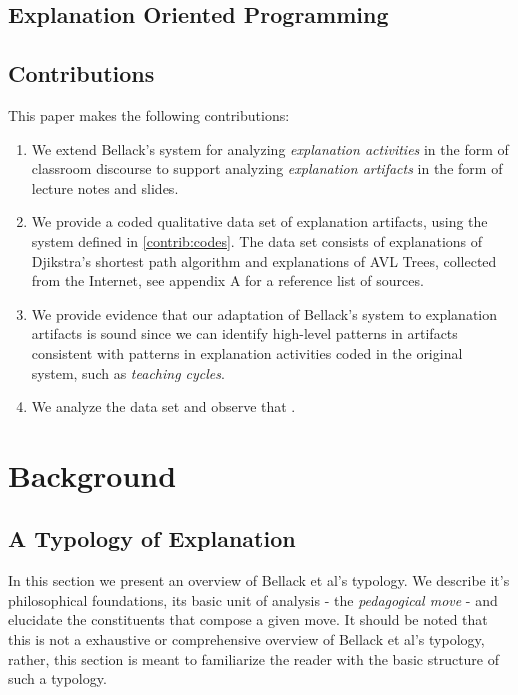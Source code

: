 \documentclass[conference]{IEEEtran}
\begin{document}
\subsection{Explanation Oriented Programming}

\subsection{Contributions}
This paper makes the following contributions:
%
\begin{enumerate}[C1.]

\item \label{contrib:codes}
%
We extend Bellack's system for analyzing \emph{explanation activities} in the
form of classroom discourse to support analyzing \emph{explanation artifacts}
in the form of lecture notes and slides.

\item \label{contrib:data}
%
We provide a coded qualitative data set of explanation artifacts, using the
system defined in \ref{contrib:codes}. The data set consists of 
explanations of Djikstra's shortest path algorithm and  explanations
of AVL Trees, collected from the Internet, see appendix A for a reference list
of sources.

\item \label{contrib:valid}
%
We provide evidence that our adaptation of Bellack's system to explanation
artifacts is sound since we can identify high-level patterns in artifacts
consistent with patterns in explanation activities coded in the original
system, such as \emph{teaching cycles}.

\item \label{contrib:valid}
%
We analyze the data set and observe that .

\end{enumerate}

\section{Background}
\subsection{A Typology of Explanation}
In this section we present an overview of Bellack et al's typology. We describe
it's philosophical foundations, its basic unit of analysis - the
\emph{pedagogical move} - and elucidate the constituents that compose a given
move. It should be noted that this is not a exhaustive or comprehensive overview
of Bellack et al's typology, rather, this section is meant to familiarize the
reader with the basic structure of such a typology.
\end{document}
